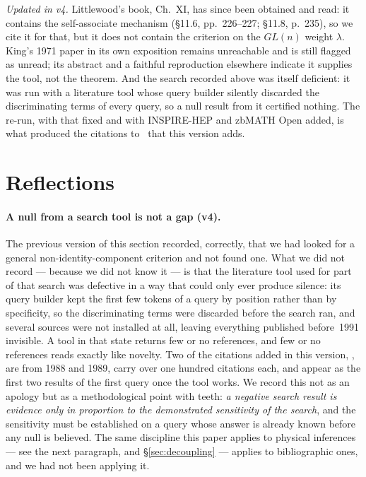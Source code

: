 \documentclass[11pt,a4paper]{article}
\begin{document}
\emph{Updated in v4.} Littlewood's book, Ch.~XI, has since been obtained and read: it contains
the self-associate mechanism (\S11.6, pp.~226--227; \S11.8, p.~235), so we cite it for that,
but it does not contain the criterion on the $GL(n)$ weight $\lambda$. King's 1971 paper in its
own exposition remains unreachable and is still flagged as unread; its abstract and a faithful
reproduction elsewhere indicate it supplies the tool, not the theorem. And the search recorded
above was itself deficient: it was run with a literature tool whose query builder silently
discarded the discriminating terms of every query, so a null result from it certified nothing.
The re-run, with that fixed and with INSPIRE-HEP and zbMATH Open added, is what produced the
citations to~\cite{DaviesMcLachlan1,DaviesMcLachlan2,Karmakar,AHMN23} that this version adds.

\section{Reflections}\label{sec:reflections}
\paragraph{A null from a search tool is not a gap (v4).} The previous version of this section
recorded, correctly, that we had looked for a general non-identity-component criterion and not
found one. What we did not record --- because we did not know it --- is that the literature
tool used for part of that search was defective in a way that could only ever produce silence:
its query builder kept the first few tokens of a query by position rather than by specificity,
so the discriminating terms were discarded before the search ran, and several sources were not
installed at all, leaving everything published before~1991 invisible. A tool in that state
returns few or no references, and few or no references reads exactly like novelty. Two of the
citations added in this version, \cite{DaviesMcLachlan1,DaviesMcLachlan2}, are from 1988 and
1989, carry over one hundred citations each, and appear as the first two results of the first
query once the tool works. We record this not as an apology but as a methodological point with
teeth: \emph{a negative search result is evidence only in proportion to the demonstrated
sensitivity of the search}, and the sensitivity must be established on a query whose answer is
already known before any null is believed. The same discipline this paper applies to physical
inferences --- see the next paragraph, and \S\ref{sec:decoupling} --- applies to bibliographic
ones, and we had not been applying it.
\end{document}
